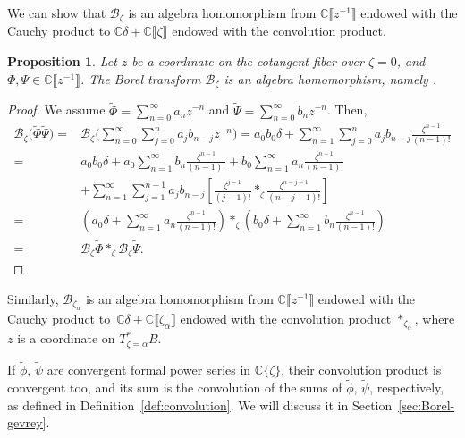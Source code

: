 \documentclass[pdftex]{sigma}
\newcommand{\C}{\mathbb{C}}
\newcommand{\series}[1]{\tilde{#1}}
\newcommand{\borel}{\mathcal{B}}
\numberwithin{equation}{section}
\newtheorem{Proposition}[Theorem]{Proposition}
 { \theoremstyle{definition}
\newtheorem{Definition}[Theorem]{Definition}
\newtheorem{Remark}[Theorem]{Remark}
\newtheorem*{notation*}{Notation}
}
\begin{document}
We can show that $\borel_\zeta$ is an algebra homomorphism from $\C\big\llbracket z^{-1}\big\rrbracket$ endowed with the Cauchy product to $\C\delta+\C\llbracket\zeta\rrbracket$ endowed with the convolution product.
\begin{Proposition}
Let $z$ be a coordinate on the cotangent fiber over $\zeta=0$, and $\series{\Phi},\series{\Psi}\in\C\big\llbracket z^{-1}\big\rrbracket$. The Borel transform $\borel_\zeta$ is an algebra homomorphism, namely
\smash{$\borel_\zeta\bigl(\series{\Phi}\series{\Psi}\bigr)=\borel_\zeta\series{\Phi} \ast_\zeta \borel_\zeta\series{\Psi}$}.
\end{Proposition}
\begin{proof}
 We assume $\series{\Phi}=\sum_{n=0}^\infty a_nz^{-n}$ and $\series{\Psi}=\sum_{n=0}^\infty b_nz^{-n}$. Then,
 \begin{align*}
\borel_\zeta\bigl(\series{\Phi}\series{\Psi}\bigr)={}&\borel_\zeta\Bigg(\sum_{n=0}^\infty\sum_{j=0}^na_jb_{n-j}z^{-n}\Bigg)=a_0b_0\delta +\sum_{n=1}^\infty\sum_{j=0}^na_jb_{n-j}\frac{\zeta^{n-1}}{(n-1)!}\\
={}&a_0b_0\delta+a_0\sum_{n=1}^\infty b_{n}\frac{\zeta^{n-1}}{(n-1)!}+b_0\sum_{n=1}^\infty a_n\frac{\zeta^{n-1}}{(n-1)!} \\
& + \sum_{n=1}^\infty\sum_{j=1}^{n-1}a_jb_{n-j}\left[\frac{\zeta^{j-1}}{(j-1)!} \ast_\zeta \frac{\zeta^{n-j-1}}{(n-j-1)!}\right]\\
={}&\left(a_0\delta+\sum_{n=1}^\infty a_n\frac{\zeta^{n-1}}{(n-1)!}\right)\ast_\zeta\left(b_0\delta+\sum_{n=1}^\infty b_n\frac{\zeta^{n-1}}{(n-1)!}\right)\\
={}&\borel_\zeta\series{\Phi} \ast_\zeta \borel_\zeta\series{\Psi}.\tag*{\qed}
\end{align*}\renewcommand{\qed}{}
\end{proof}

Similarly, $\borel_{\zeta_\alpha}$ is an algebra homomorphism from $\C\big\llbracket z^{-1}\big\rrbracket$ endowed with the Cauchy product to~${\C\delta+\C\llbracket\zeta_\alpha\rrbracket}$ endowed with the convolution product $\ast_{\zeta_\alpha}$, where $z$ is a coordinate on $T^*_{\zeta=\alpha}B$.

\begin{Remark}
If $\series{\phi}$, $\series{\psi}$ are convergent formal power series in $\C\{\zeta\}$, their convolution product is convergent too, and its sum is the convolution of the sums of $\series{\phi}$, $\series{\psi}$, respectively, as defined in Definition~\ref{def:convolution}. We will discuss it in Section~\ref{sec:Borel-gevrey}.
\end{Remark}
\end{document}
